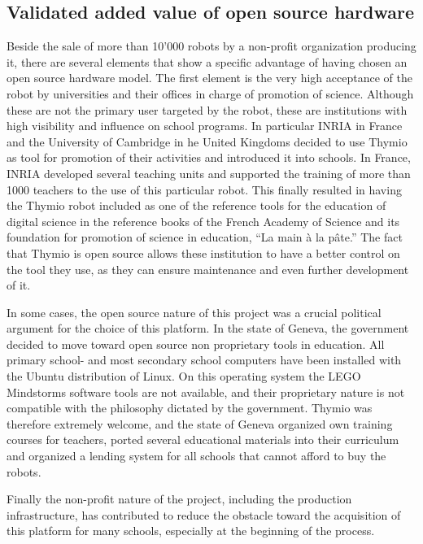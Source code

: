 \documentclass[letterpaper, 10 pt, conference]{ieeeconf}  %
\begin{document}
\subsection{Validated added value of open source hardware}

Beside the sale of more than 10'000 robots by a non-profit organization producing it, there are several elements that show a specific advantage of having chosen an open source hardware model.
The first element is the very high acceptance of the robot by universities and their offices in charge of promotion of science.
Although these are not the primary user targeted by the robot, these are institutions with high visibility and influence on school programs. 
In particular INRIA in France and the University of Cambridge in he United Kingdoms decided to use Thymio as tool for promotion of their activities and introduced it into schools.
In France, INRIA developed several teaching units and supported the training of more than 1000 teachers to the use of this particular robot. 
This finally resulted in having the Thymio robot included as one of the reference tools for the education of digital science in the reference books of the French Academy of Science and its foundation for promotion of science in education, ``La main \`a la p\^ate.''
The fact that Thymio is open source allows these institution to have a better control on the tool they use, as they can ensure maintenance and even further development of it. 

In some cases, the open source nature of this project was a crucial political argument for the choice of this platform.
In the state of Geneva, the government decided to move toward open source non proprietary tools in education.
All primary school- and most secondary school computers have been installed with the Ubuntu distribution of Linux. 
On this operating system the LEGO Mindstorms software tools are not available, and their proprietary nature is not compatible with the philosophy dictated by the government. 
Thymio was therefore extremely welcome, and the state of Geneva organized own training courses for teachers, ported several educational materials into their curriculum and organized a lending system for all schools that cannot afford to buy the robots.

Finally the non-profit nature of the project, including the production infrastructure, has contributed to reduce the obstacle toward the acquisition of this platform for many schools, especially at the beginning of the process.
\end{document}
